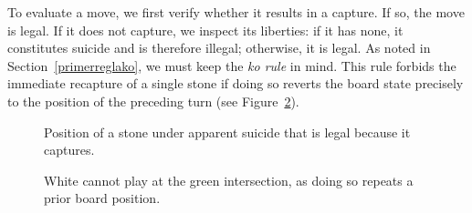 To evaluate a move, we first verify whether it results in a capture. If so, the move is legal. If it does not capture, we inspect its liberties: if it has none, it constitutes suicide and is therefore illegal; otherwise, it is legal. As noted in Section~\ref{primerreglako}, we must keep the \textit{ko rule} in mind. This rule forbids the immediate recapture of a single stone if doing so reverts the board state precisely to the position of the preceding turn (see Figure~\ref{regla_ko_ej}). 
\begin{figure}[H]
	\centering
\begin{goban}[7, hoshi = false, name = ko1]
\end{goban}
\quad
\begin{goban}[7, hoshi = false, resume = ko1, captures]
\end{goban}
	\caption{Position of a stone under apparent suicide that is legal because it captures.}
	\label{fig: fig1.19}
\end{figure}


\begin{figure}[H]
	\centering
\begin{goban}[7, hoshi = false, resume = {ko1, numbers}]
\end{goban}
\quad
\begin{goban}[7, hoshi = false, resume = ko1, captures]
\end{goban}
	\caption{White cannot play at the \textcolor{Moss}{green intersection}, as doing so repeats a prior board position.}
	\label{regla_ko_ej}
\end{figure}

